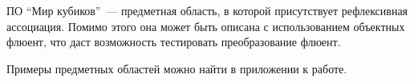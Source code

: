 ПО ``Мир кубиков''~--- предметная область,  в которой присутствует рефлексивная ассоциация. Помимо этого она может быть описана с использованием объектных флюент, что даст возможность тестировать преобразование флюент.

Примеры предметных областей можно найти в приложении к работе. 






\newpage